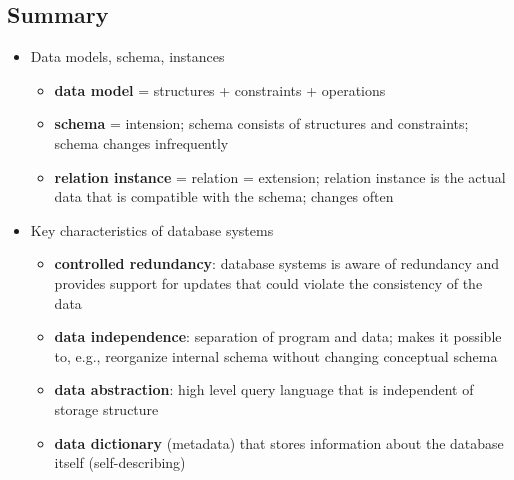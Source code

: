 \subsection{Summary}
\begin{itemize}
    \item Data models, schema, instances
    \begin{itemize}
        \item \textbf{data model} = structures + constraints + operations
        \item \textbf{schema} = intension; schema consists of structures and constraints; schema changes infrequently 
        \item \textbf{relation instance} = relation = extension; relation instance is the actual data that is compatible with the schema; changes often
    \end{itemize}
    \item Key characteristics of database systems
    \begin{itemize}
        \item \textbf{controlled redundancy}: database systems is aware of redundancy and provides support for updates that could violate the consistency of the data
        \item \textbf{data independence}: separation of program and data; makes it possible to, e.g., reorganize internal schema without changing conceptual schema
        \item \textbf{data abstraction}: high level query language that is independent of storage structure
        \item \textbf{data dictionary} (metadata) that stores information about the database itself (self-describing)
    \end{itemize}
\end{itemize}